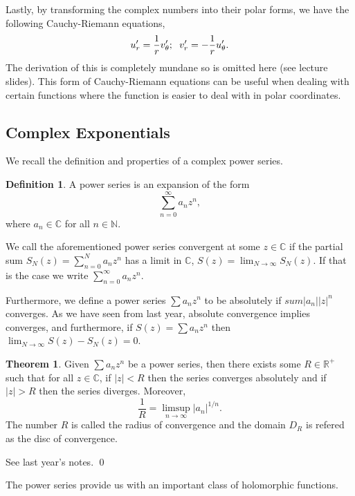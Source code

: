 \documentclass[
]{article}
\theoremstyle{definition}
\newtheorem{theorem}{Theorem}
\theoremstyle{definition}
\newtheorem{definition}{Definition}[section]
\begin{document}
Lastly, by transforming the complex numbers into their polar forms, we
have the following Cauchy-Riemann equations,
\[u_r' = \frac{1}{r}v_\theta'; \hspace{2mm} v_r' = - \frac{1}{r}u_\theta'.\]
The derivation of this is completely mundane so is omitted here (see
lecture slides). This form of Cauchy-Riemann equations can be useful
when dealing with certain functions where the function is easier to deal
with in polar coordinates.

\hypertarget{complex-exponentials}{%
\subsection{Complex Exponentials}\label{complex-exponentials}}

We recall the definition and properties of a complex power series.

\begin{definition}
  A power series is an expansion of the form 
  \[\sum_{n = 0}^\infty a_n z^n,\]
  where \(a_n \in \mathbb{C}\) for all \(n \in \mathbb{N}\).
\end{definition}

We call the aforementioned power series convergent at some
\(z \in \mathbb{C}\) if the partial sum
\(S_N(z) = \sum_{n = 0}^N a_n z^n\) has a limit in \(\mathbb{C}\),
\(S(z) = \lim_{N \to \infty} S_N(z)\). If that is the case we write
\(\sum_{n = 0}^\infty a_n z^n\).

Furthermore, we define a power series \(\sum a_n z^n\) to be absolutely
if \(sum \left| a_n \right| \left| z \right|^n\) converges. As we have
seen from last year, absolute convergence implies converges, and
furthermore, if \(S(z) = \sum a_n z^n\) then
\(\lim_{N \to \infty} S(z) - S_N(z) = 0\).

\begin{theorem}
  Given \(\sum a_n z^n\) be a power series, then there exists some 
  \(R \in \mathbb{R}^+\) such that for all \(z \in \mathbb{C}\), if 
  \(\left| z \right| < R\) then the series converges absolutely and if 
  \(\left| z \right| > R\) then the series diverges. Moreover, 
  \[\frac{1}{R} = \limsup_{n \to \infty} \left| a_n \right|^{1 / n}.\]
  The number \(R\) is called the radius of convergence and the domain 
  \(D_R\) is refered as the disc of convergence. 
\end{theorem}
\proof

See last year's notes. \qed

The power series provide us with an important class of holomorphic
functions.
\end{document}
